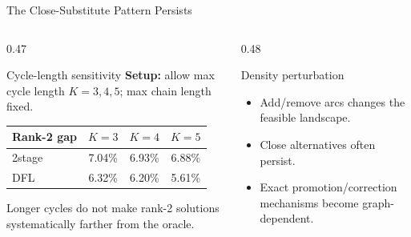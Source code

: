 \documentclass[aspectratio=169,10pt]{beamer}
\newcommand{\tightitems}{\setlength{\itemsep}{0.35em}}
\begin{document}
\begin{frame}{The Close-Substitute Pattern Persists}
  \small
  \begin{columns}[T,onlytextwidth]
    \begin{column}{0.47\textwidth}
      \begin{block}{Cycle-length sensitivity}
        \textbf{Setup:} allow max cycle length $K=3,4,5$; max chain length fixed.

        \vspace{0.55em}
        \begin{tabular}{@{}lccc@{}}
          \toprule
          Rank-2 gap & $K=3$ & $K=4$ & $K=5$ \\
          \midrule
          2stage & 7.04\% & 6.93\% & 6.88\% \\
          DFL   & 6.32\% & 6.20\% & 5.61\% \\
          \bottomrule
        \end{tabular}

        \vspace{0.4em}
        \scriptsize
        Longer cycles do not make rank-2 solutions systematically farther from the oracle.
      \end{block}
    \end{column}

    \begin{column}{0.48\textwidth}
      \begin{exampleblock}{Density perturbation}
        \begin{itemize}\tightitems
          \item Add/remove arcs changes the feasible landscape.
          \item Close alternatives often persist.
          \item Exact promotion/correction mechanisms become graph-dependent.
        \end{itemize}

        \vspace{0.35em}
        \centering
      \end{exampleblock}
    \end{column}
  \end{columns}


\end{frame}
\end{document}
